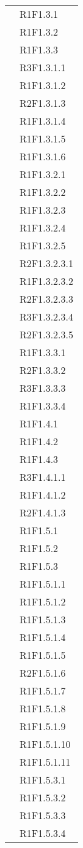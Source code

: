\begin{longtable}{|>{\centering}m{5cm}|m{5cm}<{\centering}|}
&{R1F1.3.1}\\
&{R1F1.3.2}\\
&{R1F1.3.3}\\
&{R3F1.3.1.1}\\
&{R1F1.3.1.2}\\
&{R2F1.3.1.3}\\
&{R1F1.3.1.4}\\
&{R1F1.3.1.5}\\
&{R1F1.3.1.6}\\
&{R1F1.3.2.1}\\
&{R1F1.3.2.2}\\
&{R1F1.3.2.3}\\
&{R1F1.3.2.4}\\
&{R1F1.3.2.5}\\
&{R2F1.3.2.3.1}\\
&{R1F1.3.2.3.2}\\
&{R2F1.3.2.3.3}\\
&{R3F1.3.2.3.4}\\
&{R2F1.3.2.3.5}\\
&{R1F1.3.3.1}\\
&{R2F1.3.3.2}\\
&{R3F1.3.3.3}\\
&{R1F1.3.3.4}\\

&{R1F1.4.1}\\
&{R1F1.4.2}\\
&{R1F1.4.3}\\
&{R3F1.4.1.1}\\
&{R1F1.4.1.2}\\
&{R2F1.4.1.3}\\

&{R1F1.5.1}\\
&{R1F1.5.2}\\
&{R1F1.5.3}\\
&{R1F1.5.1.1}\\
&{R1F1.5.1.2}\\
&{R1F1.5.1.3}\\
&{R1F1.5.1.4}\\
&{R1F1.5.1.5}\\
&{R2F1.5.1.6}\\
&{R1F1.5.1.7}\\
&{R1F1.5.1.8}\\
&{R1F1.5.1.9}\\
&{R1F1.5.1.10}\\
&{R1F1.5.1.11}\\
&{R1F1.5.3.1}\\
&{R1F1.5.3.2}\\
&{R1F1.5.3.3}\\
&{R1F1.5.3.4}\\


\end{longtable}
